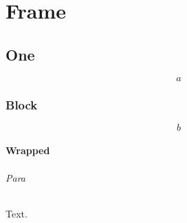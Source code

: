 \documentclass{report}
\begin{document}
\part{Frame}
\chapter{One}
\begin{equation}a\end{equation}
\section{Block}
\begin{equation}b\end{equation}
\subsection{Wrapped}
\paragraph{Para} Text.
\end{document}
